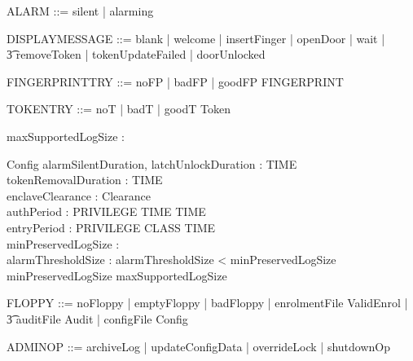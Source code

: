 \begin{zed}
	ALARM ::= silent | alarming
\end{zed}

\begin{zed}
	DISPLAYMESSAGE ::= blank | welcome | insertFinger | openDoor |
                        wait | 
\\      \t3  removeToken | tokenUpdateFailed | doorUnlocked
\end{zed}

\begin{zed}
	FINGERPRINTTRY ::= noFP | badFP | goodFP \ldata FINGERPRINT \rdata
\also
\end{zed}

\begin{zed}
	TOKENTRY ::= noT | badT | goodT \ldata Token \rdata
\end{zed}

\begin{zed}
	[ Audit ]
\end{zed}

\begin{axdef}
        maxSupportedLogSize : \nat
\end{axdef}

\begin{schema}{Config}
	alarmSilentDuration, latchUnlockDuration : TIME
\\      tokenRemovalDuration : TIME
\\      enclaveClearance : Clearance
\\      authPeriod : PRIVILEGE \fun TIME \fun \power TIME
\\      entryPeriod : PRIVILEGE \fun CLASS \fun \power TIME
\\      minPreservedLogSize : \nat
\\      alarmThresholdSize : \nat
\where
        alarmThresholdSize < minPreservedLogSize 
\\      minPreservedLogSize \leq maxSupportedLogSize     
\end{schema}

\begin{zed}
       FLOPPY ::=  noFloppy | emptyFloppy | badFloppy | 
       enrolmentFile \ldata ValidEnrol \rdata |
\\ \t3    auditFile \ldata \finset Audit \rdata |
          configFile \ldata Config \rdata
\end{zed}

\begin{zed}
        ADMINOP ::=  archiveLog | updateConfigData |
        overrideLock | shutdownOp 
\end{zed}

